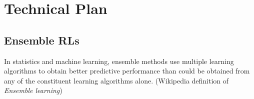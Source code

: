 



\section*{Technical Plan}

\subsection{Ensemble RLs}
In statistics and machine learning, ensemble methods use multiple learning algorithms to obtain better predictive performance than could be obtained from any of the constituent learning algorithms alone. (Wikipedia definition of \emph{Ensemble learning})



